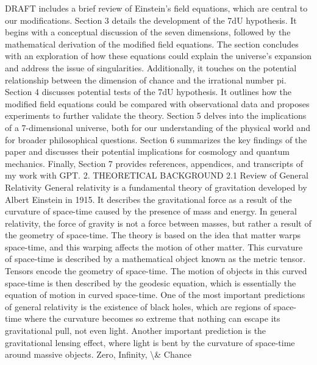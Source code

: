 \documentclass[12pt]{article}
\begin{document}
DRAFT
includes a brief review of Einstein's ﬁeld equations, which are central to our
modiﬁcations.
Section 3 details the development of the 7dU hypothesis. It begins with a conceptual
discussion of the seven dimensions, followed by the mathematical derivation of the
modiﬁed ﬁeld equations. The section concludes with an exploration of how these
equations could explain the universe's expansion and address the issue of
singularities. Additionally, it touches on the potential relationship between the
dimension of chance and the irrational number pi.
Section 4 discusses potential tests of the 7dU hypothesis. It outlines how the modiﬁed
ﬁeld equations could be compared with observational data and proposes experiments
to further validate the theory.
Section 5 delves into the implications of a 7-dimensional universe, both for our
understanding of the physical world and for broader philosophical questions.
Section 6 summarizes the key ﬁndings of the paper and discusses their potential
implications for cosmology and quantum mechanics.
Finally, Section 7 provides references, appendices, and transcripts of my work with
GPT.
2. THEORETICAL BACKGROUND
2.1 Review of General Relativity
General relativity is a fundamental theory of gravitation developed by Albert Einstein in 1915. It
describes the gravitational force as a result of the curvature of space-time caused by the presence
of mass and energy. In general relativity, the force of gravity is not a force between masses, but
rather a result of the geometry of space-time.
The theory is based on the idea that matter warps space-time, and this warping affects the motion
of other matter. This curvature of space-time is described by a mathematical object known as the
metric tensor. Tensors encode the geometry of space-time. The motion of objects in this curved
space-time is then described by the geodesic equation, which is essentially the equation of
motion in curved space-time.
One of the most important predictions of general relativity is the existence of black holes, which
are regions of space-time where the curvature becomes so extreme that nothing can escape its
gravitational pull, not even light. Another important prediction is the gravitational lensing effect,
where light is bent by the curvature of space-time around massive objects.
Zero, Infinity, \textbackslash{}& Chance
\end{document}
